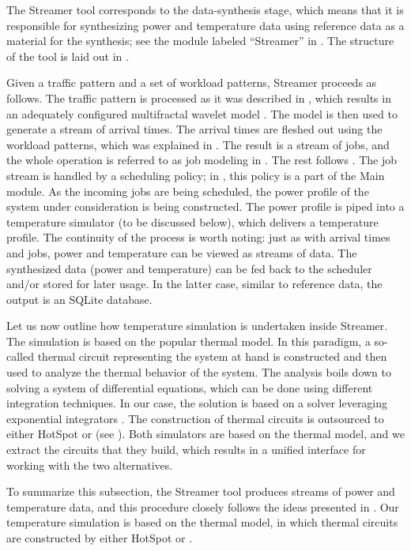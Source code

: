 
The Streamer tool corresponds to the data-synthesis stage, which means that it
is responsible for synthesizing power and temperature data using reference data
as a material for the synthesis; see the module labeled ``Streamer'' in
. The structure of the tool is laid out in .

Given a traffic pattern and a set of workload patterns, Streamer proceeds as
follows. The traffic pattern is processed as it was described in ,
which results in an adequately configured multifractal wavelet model
\cite{riedi1999}. The model is then used to generate a stream of arrival times.
The arrival times are fleshed out using the workload patterns, which was
explained in . The result is a stream of jobs, and the whole
operation is referred to as job modeling in . The rest follows
. The job stream is handled by a scheduling policy; in
, this policy is a part of the Main module. As the incoming jobs
are being scheduled, the power profile of the system under consideration is
being constructed. The power profile is piped into a temperature simulator (to
be discussed below), which delivers a temperature profile. The continuity of the
process is worth noting: just as with arrival times and jobs, power and
temperature can be viewed as streams of data. The synthesized data (power and
temperature) can be fed back to the scheduler and/or stored for later usage. In
the latter case, similar to reference data, the output is an SQLite database.

Let us now outline how temperature simulation is undertaken inside Streamer. The
simulation is based on the popular thermal  model. In this paradigm, a
so-called thermal  circuit representing the system at hand is constructed
and then used to analyze the thermal behavior of the system. The analysis boils
down to solving a system of differential equations, which can be done using
different integration techniques. In our case, the solution is based on a solver
leveraging exponential integrators \cite{hochbruck2010, ukhov2014}. The
construction of thermal circuits is outsourced to either HotSpot
\cite{skadron2004} or  \cite{sridhar2010} (see ). Both
simulators are based on the thermal  model, and we extract the circuits
that they build, which results in a unified interface for working with the two
alternatives.

To summarize this subsection, the Streamer tool produces streams of power and
temperature data, and this procedure closely follows the ideas presented in
. Our temperature simulation is based on the thermal 
model, in which thermal circuits are constructed by either HotSpot or
.
